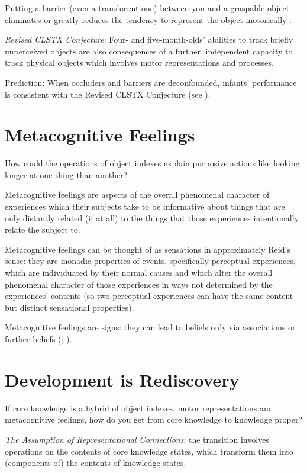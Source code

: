 \documentclass[12pt]{extarticle}
\begin{document}
\begin{multicols*}{3}
Putting a barrier (even a translucent one) between you and a graspable object eliminates or greatly reduces the tendency to represent the object motorically \citep[e.g.][]{costantini:2010_where}.

\emph{Revised CLSTX Conjecture}:
Four- and five-month-olds' abilities to track briefly unperceived objects are also consequences of a further, independent capacity to track physical objects which involves motor representations and processes.

Prediction: When occluders and barriers are deconfounded, infants’ performance is consistent with the Revised CLSTX Conjecture (see \citealp{mccurry:2009_beyond}).


\section{Metacognitive Feelings}
How could the operations of object indexes explain purposive actions like looking longer at one thing than another?

Metacognitive feelings are aspects of the overall phenomenal character of experiences which their subjects take to be informative about things that are only distantly related (if at all) to the things that those experiences intentionally relate the subject to.

Metacognitive feelings can be thought of as sensations in approximately Reid’s sense: they are monadic properties of events, specifically perceptual experiences,
which are individuated by their normal causes
and which alter the overall phenomenal character of those experiences in ways not determined by the experiences’ contents
(so two perceptual experiences can have the same content but distinct sensational properties).

Metacognitive feelings are signs:
they can lead to beliefs only via associations or further beliefs
(\citealp[Essay~II, Chap.~16, p.~228]{Reid:1785cj};
\citealp[Chap.~VI sect.~III, pp.~164–5]{Reid:1785nz}).


\section{Development is Rediscovery}
If core knowledge is a hybrid of object indexes, motor representations and metacognitive feelings,
how do you get from core knowledge to knowledge proper?

\emph{The Assumption of Representational Connections}: the transition involves operations on the contents of core knowledge states, which transform them into (components of) the contents of knowledge states.


\end{multicols*}
\end{document}
